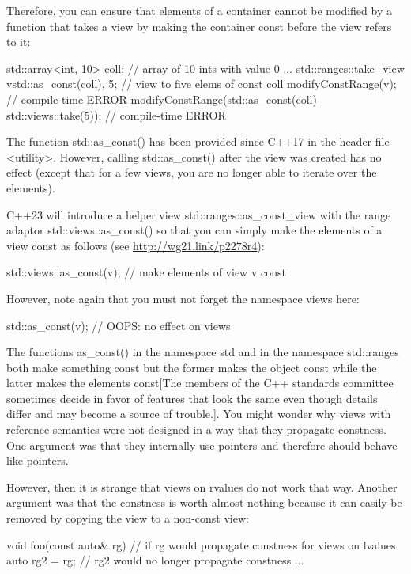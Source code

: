 Therefore, you can ensure that elements of a container cannot be modified by a function that takes a view by making the container const before the view refers to it:

\begin{cpp}
std::array<int, 10> coll{}; // array of 10 ints with value 0
...
std::ranges::take_view v{std::as_const(coll), 5}; // view to five elems of const coll
modifyConstRange(v); // compile-time ERROR
modifyConstRange(std::as_const(coll) | std::views::take(5)); // compile-time ERROR
\end{cpp}

The function std::as\_const() has been provided since C++17 in the header file <utility>. However, calling std::as\_const() after the view was created has no effect (except that for a few views, you are no longer able to iterate over the elements).

C++23 will introduce a helper view std::ranges::as\_const\_view with the range adaptor std::views::as\_const() so that you can simply make the elements of a view const as follows (see \url{http://wg21.link/p2278r4}):

\begin{cpp}
std::views::as_const(v); // make elements of view v const
\end{cpp}

However, note again that you must not forget the namespace views here:

\begin{cpp}
std::as_const(v); // OOPS: no effect on views
\end{cpp}

The functions as\_const() in the namespace std and in the namespace std::ranges both make something const but the former makes the object const while the latter makes the elements const[The members of the C++ standards committee sometimes decide in favor of features that look the same even though details differ and may become a source of trouble.]. You might wonder why views with reference semantics were not designed in a way that they propagate constness. One argument was that they internally use pointers and therefore should behave like pointers.

However, then it is strange that views on rvalues do not work that way. Another argument was that the constness is worth almost nothing because it can easily be removed by copying the view to a non-const view:

\begin{cpp}
void foo(const auto& rg) // if rg would propagate constness for views on lvalues
{
	auto rg2 = rg; // rg2 would no longer propagate constness
	...
}
\end{cpp}

